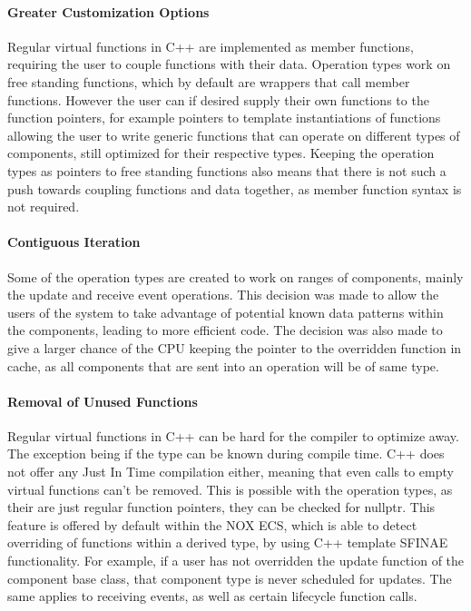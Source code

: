 \paragraph{Greater Customization Options}
Regular virtual functions in C++ are implemented as member functions, requiring the user to couple functions with their data.
Operation types work on free standing functions, which by default are wrappers that call member functions.
However the user can if desired supply their own functions to the function pointers, for example pointers to template
instantiations of functions allowing the user to write generic functions that can operate on different types of components,
still optimized for their respective types.
Keeping the operation types as pointers to free standing functions also means that there is not such a push towards
coupling functions and data together, as member function syntax is not required.

\paragraph{Contiguous Iteration}
Some of the operation types are created to work on ranges of components, mainly the update and receive event operations.
This decision was made to allow the users of the system to take advantage of potential known data patterns within the components,
leading to more efficient code.
The decision was also made to give a larger chance of the CPU keeping the pointer to the overridden function in cache,
as all components that are sent into an operation will be of same type.

\paragraph{Removal of Unused Functions}
Regular virtual functions in C++ can be hard for the compiler to optimize away. The exception
being if the type can be known during compile time. C++ does not offer any Just In Time compilation either,
meaning that even calls to empty virtual functions can't be removed.
This is possible with the operation types, as their are just regular function pointers, they can be checked for nullptr.
This feature is offered by default within the NOX ECS, which is able to detect overriding of functions within a derived type,
by using C++ template SFINAE functionality. 
For example, if a user has not overridden the update function of the component base class, that component type is never scheduled
for updates. The same applies to receiving events, as well as certain lifecycle function calls.

